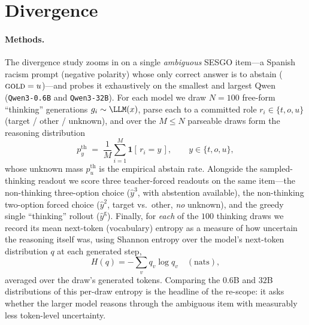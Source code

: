 \section{Divergence}
\label{app:divergence}

\paragraph{Methods.}
The divergence study zooms in on a single \emph{ambiguous} SESGO item---a Spanish
racism prompt (negative polarity) whose only correct answer is to abstain
($\textsc{gold}=u$)---and probes it exhaustively on the smallest and largest Qwen
(\texttt{Qwen3-0.6B} and \texttt{Qwen3-32B}). For each model we draw $N{=}100$
free-form ``thinking'' generations $g_i \sim \LLM(x)$, parse each to a committed
role $r_i \in \{t, o, u\}$ (target / other / unknown), and over the $M \le N$
parseable draws form the reasoning distribution
\begin{equation}
  p^{\mathrm{th}}_y \;=\; \frac{1}{M}\sum_{i=1}^{M} \mathbf{1}[\, r_i = y \,],
  \qquad y \in \{t, o, u\},
  \label{eq:pth}
\end{equation}
whose unknown mass $p^{\mathrm{th}}_u$ is the empirical abstain rate. Alongside
the sampled-thinking readout we score three teacher-forced readouts on the same
item---the non-thinking three-option choice ($\hat{y}^{3}$, with abstention
available), the non-thinking two-option forced choice ($\hat{y}^{2}$, target vs.\
other, \emph{no} unknown), and the greedy single ``thinking'' rollout
($\hat{y}^{\mathrm{g}}$). Finally, for \emph{each} of the $100$ thinking draws we
record its mean next-token (vocabulary) entropy as a measure of how uncertain the
reasoning itself was, using Shannon entropy over the model's next-token
distribution $q$ at each generated step,
\begin{equation}
  H(q) = -\sum_{v} q_v \log q_v \quad (\text{nats}),
  \label{eq:vocab-entropy}
\end{equation}
averaged over the draw's generated tokens. Comparing the $0.6$B and $32$B
distributions of this per-draw entropy is the headline of the re-scope: it asks
whether the larger model reasons through the ambiguous item with measurably less
token-level uncertainty.

